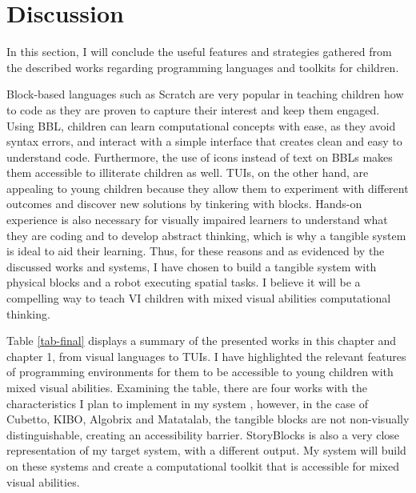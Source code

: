 \documentclass[oneside,%
                    author={Malak Hajji},
                    degree={BSc},
                    title={Designing An Accessible Computational Toolkit For Students},
                  subtitle={With Mixed Visual Abilities}]{dissertation}
\begin{document}
\section{Discussion} 
In this section, I will conclude the useful features and strategies gathered from the described works regarding programming languages and toolkits for children. 

Block-based languages such as Scratch are very popular in teaching children how to code as they are proven to capture their interest and keep them engaged. Using BBL, children can learn computational concepts with ease, as they avoid syntax errors, and interact with a simple interface that creates clean and easy to understand code. Furthermore, the use of icons instead of text on BBLs makes them accessible to illiterate children as well. 
TUIs, on the other hand, are appealing to young children because they allow them to experiment with different outcomes and discover new solutions by tinkering with blocks. 
Hands-on experience is also necessary for visually impaired learners to understand what they are coding and to develop abstract thinking, which is why a tangible system is ideal to aid their learning. Thus, for these reasons and as evidenced by the discussed works and systems, I have chosen to build a tangible system with physical blocks and a robot executing spatial tasks. I believe it will be a compelling way to teach VI children with mixed visual abilities computational thinking.

Table \ref{tab-final} displays a summary of the presented works in this chapter and chapter 1, from visual languages to TUIs.
I have highlighted the relevant features of programming environments for them to be accessible to young children with mixed visual abilities. 
Examining the table, there are four works with the characteristics I plan to implement in my system , however, in the case of Cubetto\cite{Cubetto}, KIBO\cite{kibo}, Algobrix and Matatalab, the tangible blocks are not non-visually distinguishable, creating an accessibility barrier. StoryBlocks\cite{storyblocks} is also a very close representation of my target system, with a different output. My system will build on these systems and create a computational toolkit that is accessible for mixed visual abilities. 

\end{document}
